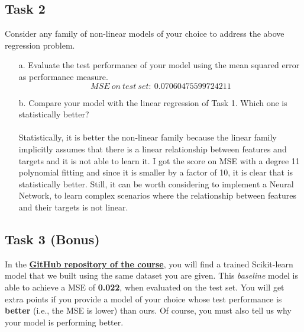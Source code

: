\documentclass[11pt]{scrartcl}
\begin{document}
\subsection*{Task 2}
Consider any family of non-linear models of your choice to address the above regression problem.
\begin{itemize}
	\item [a.] Evaluate the test performance of your model using the mean squared error as performance measure. 
 $$MSE\ on\ test\ set:\ 0.07060475599724211 $$
	\item [b.] Compare your model with the linear regression of Task 1. Which one is {statistically} better?\\\\
 Statistically, it is better the non-linear family because the linear family implicitly assumes that there is a linear relationship between features and targets and it is not able to learn it. I got the score on MSE with a degree 11 polynomial fitting and since it is smaller by a factor of 10, it is clear that is statistically better. Still, it can be worth considering to implement a Neural Network, to learn complex scenarios where the relationship between features and their targets is not linear.
\end{itemize}

\subsection*{Task 3 (Bonus)}
In the \href{https://github.com/GiorgiaAuroraAdorni/ML-bachelor-course-assignments-sp23}{\textbf{GitHub repository of the course}}, you will find a trained Scikit-learn model that we built using the same dataset you are given. 
This \textit{baseline} model is able to achieve a MSE of \textbf{0.022}, when evaluated on the test set. 
You will get extra points if you provide a model of your choice whose test performance is \textbf{better} (i.e., the MSE is lower) than ours. Of course, you must also tell us why your model is performing better.
\\
\end{document}
